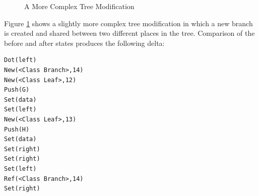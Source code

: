 %
\begin{figure}
\hfill{}


\caption{A More Complex Tree Modification\label{fig:A-More-Complex}}

\end{figure}

Figure \ref{fig:A-More-Complex} shows a slightly more complex tree
modification in which a new branch is created and shared between two
different places in the tree. Comparison of the before and after states
produces the following delta:

\begin{lstlisting}
Dot(left)
New(<Class Branch>,14)
New(<Class Leaf>,12)
Push(G)
Set(data)
Set(left)
New(<Class Leaf>,13)
Push(H)
Set(data)
Set(right)
Set(right)
Set(left)
Ref(<Class Branch>,14)
Set(right)
\end{lstlisting}
